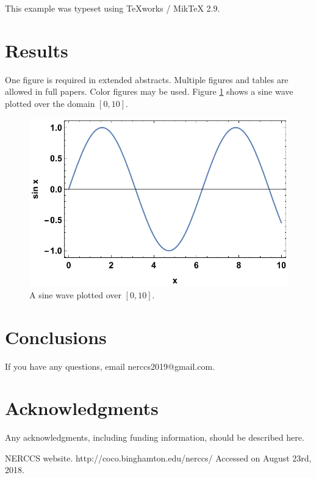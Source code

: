 \documentclass[12pt]{article}
\begin{document}
This example was typeset using TeXworks / MikTeX 2.9.

\section{Results}

One figure is required in extended abstracts. Multiple figures and tables are allowed in full papers. Color figures may be used. Figure \ref{fig:sinx} shows a sine wave plotted over the domain $[0,10]$.

\begin{figure}[h]
\centering
\includegraphics[width=0.5\columnwidth]{fig1.pdf}
\caption{A sine wave plotted over $[0,10]$.}
\label{fig:sinx}
\end{figure}

\section{Conclusions}

If you have any questions, email nerccs2019@gmail.com.

\section*{Acknowledgments}

Any acknowledgments, including funding information, should be described here.

\begin{thebibliography}{99}

 NERCCS website. http://coco.binghamton.edu/nerccs/ Accessed on August 23rd, 2018.

\end{thebibliography}
\end{document}
